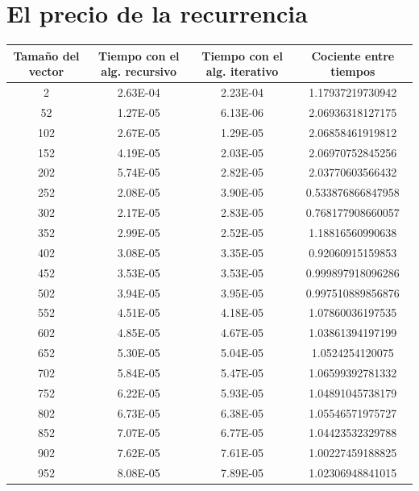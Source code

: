 \documentclass{article}
\begin{document}
	\section{El precio de la recurrencia}

	\begin{longtable}{|c|c|c|c|}
		\hline
		Tamaño del vector & Tiempo con el alg. recursivo & Tiempo con el alg. iterativo & Cociente entre tiempos \\ \hline 
		2	    &   2.63E-04	  & 2.23E-04	 &  1.17937219730942   \\ \hline
		52	    &   1.27E-05	  & 6.13E-06	 &  2.06936318127175   \\ \hline
		102	    &   2.67E-05	  & 1.29E-05	 &  2.06858461919812   \\ \hline
		152	    &   4.19E-05	  & 2.03E-05	 &  2.06970752845256   \\ \hline
		202	    &   5.74E-05	  & 2.82E-05	 &  2.03770603566432   \\ \hline
		252	    &   2.08E-05	  & 3.90E-05	 &  0.533876866847958   \\ \hline
		302	    &   2.17E-05	  & 2.83E-05	 &  0.768177908660057   \\ \hline
		352	    &   2.99E-05	  & 2.52E-05	 &  1.18816560990638   \\ \hline
		402	    &   3.08E-05	  & 3.35E-05	 &  0.92060915159853   \\ \hline
		452	    &   3.53E-05	  & 3.53E-05	 &  0.999897918096286   \\ \hline
		502	    &   3.94E-05	  & 3.95E-05	 &  0.997510889856876   \\ \hline
		552	    &   4.51E-05	  & 4.18E-05	 &  1.07860036197535   \\ \hline
		602	    &   4.85E-05	  & 4.67E-05	 &  1.03861394197199   \\ \hline
		652	    &   5.30E-05	  & 5.04E-05	 &  1.0524254120075   \\ \hline
		702	    &   5.84E-05	  & 5.47E-05	 &  1.06599392781332   \\ \hline
		752	    &   6.22E-05	  & 5.93E-05	 &  1.04891045738179   \\ \hline
		802	    &   6.73E-05	  & 6.38E-05	 &  1.05546571975727   \\ \hline
		852	    &   7.07E-05	  & 6.77E-05	 &  1.04423532329788   \\ \hline
		902	    &   7.62E-05	  & 7.61E-05	 &  1.00227459188825   \\ \hline
		952	    &   8.08E-05	  & 7.89E-05	 &  1.02306948841015   \\ \hline

\end{longtable}
\end{document}
